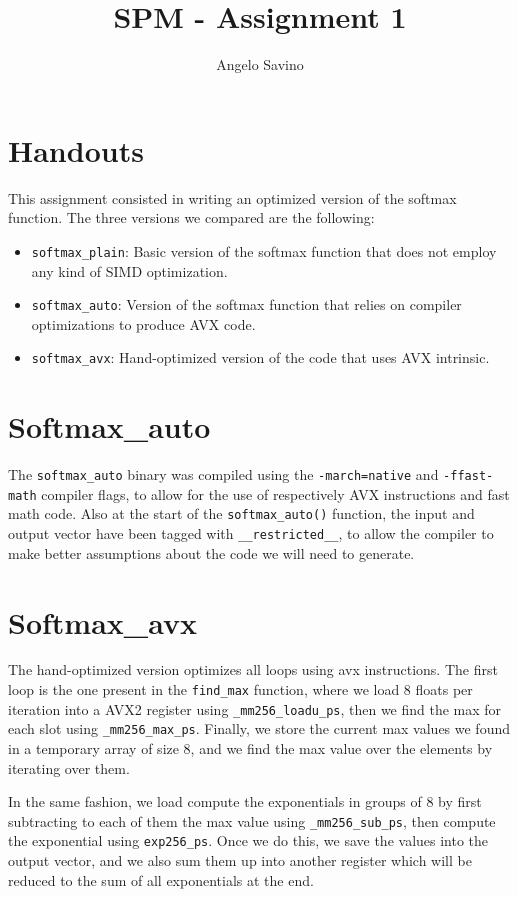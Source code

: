 \documentclass[12pt,a4paper]{article}
\title{SPM - Assignment 1}
\author{Angelo Savino}
\begin{document}
\maketitle

\section{Handouts}
This assignment consisted in writing an optimized version of the softmax function. The three versions we compared are the following:
\begin{itemize}
    \item \texttt{softmax\_plain}: Basic version of the softmax function that does not employ any kind of SIMD optimization.
    \item \texttt{softmax\_auto}: Version of the softmax function that relies on compiler optimizations to produce AVX code. 
    \item \texttt{softmax\_avx}: Hand-optimized version of the code that uses AVX intrinsic.
\end{itemize}

\section{Softmax\_auto}
The \texttt{softmax\_auto} binary was compiled using the \texttt{-march=native} and \texttt{-ffast-math} compiler flags, to allow for the use of respectively AVX instructions and fast math code.
Also at the start of the \texttt{softmax\_auto()} function, the input and output vector have been tagged with \texttt{\_\_restricted\_\_}, to allow the compiler to make better assumptions about the code we will need to generate. 

\section{Softmax\_avx}
The hand-optimized version optimizes all loops using avx instructions. The first loop is the one present in the \texttt{find\_max} function, where we load 8 floats per iteration into a AVX2 register using \texttt{\_mm256\_loadu\_ps}, then we find the max for each slot using \texttt{\_mm256\_max\_ps}. Finally, we store the current max values we found in a temporary array of size 8, and we find the max value over the elements by iterating over them. 

In the same fashion, we load compute the exponentials in groups of 8 by first subtracting to each of them the max value using \texttt{\_mm256\_sub\_ps}, then compute the exponential using \texttt{exp256\_ps}. Once we do this, we save the values into the output vector, and we also sum them up into another register which will be reduced to the sum of all exponentials at the end.
\end{document}
